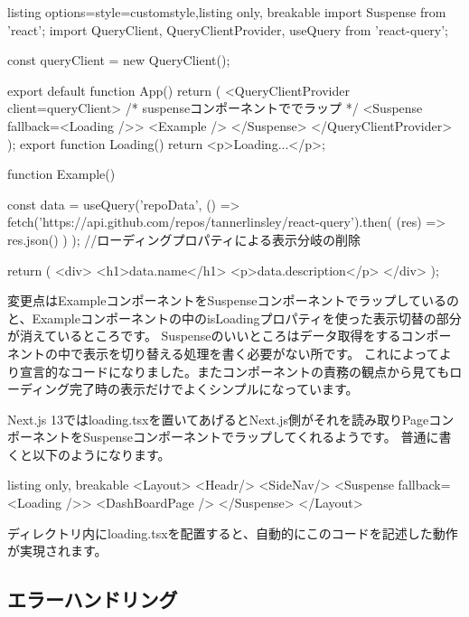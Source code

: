 \begin{tcblisting}{listing options={style=customstyle},listing only, breakable}
import { Suspense } from 'react';
import { QueryClient, QueryClientProvider, useQuery } from 'react-query';

const queryClient = new QueryClient();

export default function App() {
  return (
    <QueryClientProvider client={queryClient}>
      {/* suspenseコンポーネントででラップ */}
      <Suspense fallback={<Loading />}>
        <Example />
      </Suspense>
    </QueryClientProvider>
  );
}
export function Loading() {
  return <p>Loading...</p>;
}

function Example() {
  const { data } = useQuery('repoData', () =>
    fetch('https://api.github.com/repos/tannerlinsley/react-query').then(
      (res) => res.json()
    )
  );
  //ローディングプロパティによる表示分岐の削除

  return (
    <div>
      <h1>{data.name}</h1>
      <p>{data.description}</p>
    </div>
  );
}

\end{tcblisting}





変更点はExampleコンポーネントをSuspenseコンポーネントでラップしているのと、Exampleコンポーネントの中のisLoadingプロパティを使った表示切替の部分が消えているところです。
Suspenseのいいところはデータ取得をするコンポーネントの中で表示を切り替える処理を書く必要がない所です。
これによってより宣言的なコードになりました。またコンポーネントの責務の観点から見てもローディング完了時の表示だけでよくシンプルになっています。

Next.js 13ではloading.tsxを置いてあげるとNext.js側がそれを読み取りPageコンポーネントをSuspenseコンポーネントでラップしてくれるようです。
普通に書くと以下のようになります。



\begin{tcblisting}{listing only, breakable}
  <Layout>
    <Headr/>
    <SideNav/>
    <Suspense fallback={<Loading />}>
      <DashBoardPage />
    </Suspense>
  </Layout>
\end{tcblisting}

ディレクトリ内にloading.tsxを配置すると、自動的にこのコードを記述した動作が実現されます。



\subsection{エラーハンドリング}

